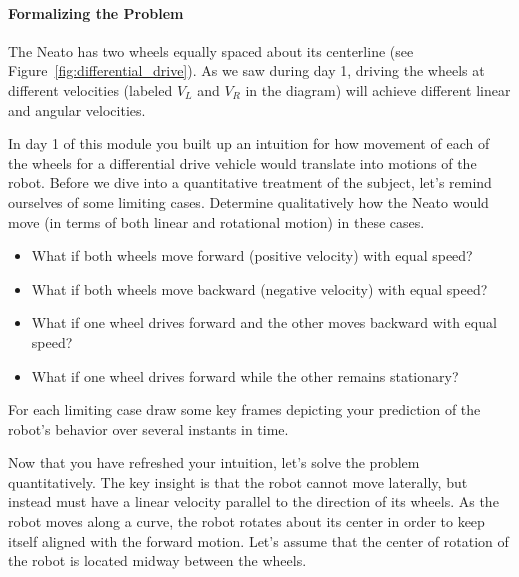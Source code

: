 \documentclass{tufte-handout}
\begin{document}

\paragraph{Formalizing the Problem}
The Neato has two wheels equally spaced about its centerline (see Figure~\ref{fig:differential_drive}).  As we saw during day 1, driving the wheels at different velocities (labeled $V_L$ and $V_R$ in the diagram) will achieve different linear and angular velocities.%

\begin{myboxi}[Exercise 1]
In day 1 of this module you built up an intuition for how movement of each of the wheels for a differential drive vehicle would translate into motions of the robot.  Before we dive into a quantitative treatment of the subject, let's remind ourselves of some limiting cases.  Determine qualitatively how the Neato would move (in terms of both linear and rotational motion) in these cases.
\begin{itemize}
\item What if both wheels move forward (positive velocity) with equal speed?
\item What if both wheels move backward (negative velocity) with equal speed?
\item What if one wheel drives forward and the other moves backward with equal speed?
\item What if one wheel drives forward while the other remains stationary?
\end{itemize}
For each limiting case draw some key frames depicting your prediction of the robot's behavior over several instants in time.
\end{myboxi}

Now that you have refreshed your intuition, let's solve the problem quantitatively.  The key insight is that the robot cannot move laterally, but instead must have a linear velocity parallel to the direction of its wheels. As the robot moves along a curve, the robot rotates about its center in order to keep itself aligned with the forward motion. Let's assume that the center of rotation of the robot is located midway between the wheels.
\end{document}
